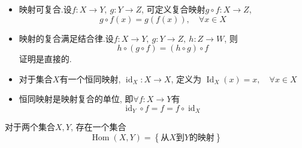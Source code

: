 \begin{itemize}
    \item 映射可复合.设$f\colon X\rightarrow Y,\ g \colon Y \rightarrow Z$, 可定义复合映射$g \circ f \colon X \rightarrow Z$,
    \begin{equation}
      g \circ f(x) = g\left( f(x) \right) , \quad \forall x\in X
    \end{equation}

    \item 映射的复合满足结合律.设$f\colon X\rightarrow Y,\ g\colon Y\rightarrow Z, \ h\colon Z\rightarrow W $, 则
    \begin{equation}
      h \circ \left( g\circ f \right) = (h \circ g) \circ f
    \end{equation}
    证明是直接的.

    \item 对于集合$X$有一个恒同映射, $\operatorname{id}_X \colon X \to X$, 定义为 $\operatorname{Id}_X(x) = x, \quad \forall x \in X$
    
    \item 恒同映射是映射复合的单位, 即$\forall f\colon X\rightarrow Y $有
    \begin{equation}
      \operatorname{id}_Y \circ f = f = f \circ \operatorname{id}_X
    \end{equation}
\end{itemize}


对于两个集合$X,Y$, 存在一个集合
\begin{equation}
  \operatorname{Hom}(X,Y) = \left\{ \text{从$X$到$Y$的映射} \right\} 
\end{equation}

